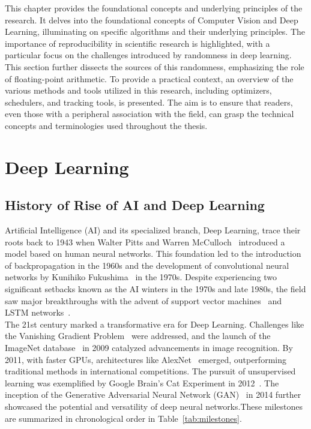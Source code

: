 


This chapter provides the foundational concepts and underlying principles of the research.
It delves into the foundational concepts of Computer Vision and Deep Learning, illuminating on specific algorithms
and their underlying principles. The importance of reproducibility in scientific research is highlighted, with a particular focus 
on the challenges introduced by randomness in deep learning. This section further dissects the sources of this randomness, 
emphasizing the role of floating-point arithmetic. To provide a practical context, an overview  of
the various methods and tools utilized in this research, including optimizers, schedulers, and tracking tools, is presented. 
The aim is to ensure that readers, even those with a peripheral association with the field, can grasp the technical concepts and 
terminologies used throughout the thesis.
\section{Deep Learning}

\subsection{History of Rise of AI and Deep Learning}


Artificial Intelligence (AI) and its specialized branch, Deep Learning, trace their roots back to 1943 when Walter Pitts and Warren McCulloch~\cite{mcculloch1943logical} introduced a model based on human neural networks. This foundation led to the introduction of backpropagation in the 1960s and the development of convolutional neural networks by Kunihiko Fukushima~\cite{fukushima1980neocognitron} in the 1970s. Despite experiencing two significant setbacks known as the AI winters in the 1970s and late 1980s, the field saw major breakthroughs with the advent of support vector machines~\cite{cortes1995support} and LSTM networks~\cite{Hochreiter1995LONGST}.\\


The 21st century marked a transformative era for Deep Learning. Challenges like the Vanishing Gradient Problem~\cite{279181} were addressed, and the launch of the ImageNet database~\cite{5206848} in 2009 catalyzed advancements in image recognition. By 2011, with faster GPUs, architectures like AlexNet~\cite{NIPS2012_c399862d} emerged, outperforming traditional methods in international competitions. The pursuit of unsupervised learning was exemplified by Google Brain's Cat Experiment in 2012~\cite{google2023brain}. The inception of the Generative Adversarial Neural Network (GAN)~\cite{goodfellow2014generative} in 2014 further showcased the potential and versatility of deep neural networks.These milestones are summarized in chronological order in Table~\ref{tab:milestones}.\\

